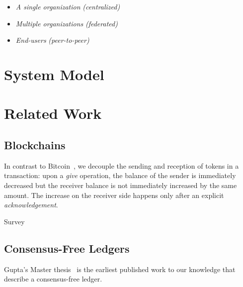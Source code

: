 \documentclass[9pt, oneside]{article}   	%
\begin{document}
\begin{itemize}
	\item \textit{A single organization} \textit{(centralized)}
	\item \textit{Multiple organizations}  \textit{(federated)}
	\item \textit{End-users} \textit{(peer-to-peer)}
\end{itemize}


\section{System Model}




\section{Related Work}

\subsection{Blockchains}

 In contrast to Bitcoin~\cite{bitcoin}, we decouple the sending and reception of tokens in a transaction: upon a \textit{give} operation, the balance of the sender is immediately decreased but the receiver balance is not immediately increased by the same amount.  The increase on the receiver side happens only  after an explicit \textit{acknowledgement}. 

Survey~\cite{weichao2018blockchain}

\subsection{Consensus-Free Ledgers} 

Gupta's Master thesis~\cite{gupta2016nonconsensusdft} is the earliest published work to our knowledge that describe a consensus-free ledger.
\end{document}

